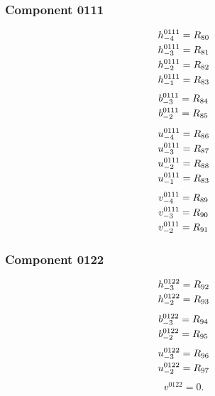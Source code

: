 \documentclass[11pt,a4paper]{article}
\begin{document}
\subsubsection{Component 0111}
\begin{equation}
\shortstack[l]{$\displaystyle h^{0111}_{-4}=R_{80}$\\
$\displaystyle h^{0111}_{-3}=R_{81}$\\
$\displaystyle h^{0111}_{-2}=R_{82}$\\
$\displaystyle h^{0111}_{-1}=R_{83}$}
\label{eq:cat-map-22}
\end{equation}
\begin{equation}
\shortstack[l]{$\displaystyle b^{0111}_{-3}=R_{84}$\\
$\displaystyle b^{0111}_{-2}=R_{85}$}
\label{eq:cat-map-23}
\end{equation}
\begin{equation}
\shortstack[l]{$\displaystyle u^{0111}_{-4}=R_{86}$\\
$\displaystyle u^{0111}_{-3}=R_{87}$\\
$\displaystyle u^{0111}_{-2}=R_{88}$\\
$\displaystyle u^{0111}_{-1}=R_{83}$}
\label{eq:cat-map-24}
\end{equation}
\begin{equation}
\shortstack[l]{$\displaystyle v^{0111}_{-4}=R_{89}$\\
$\displaystyle v^{0111}_{-3}=R_{90}$\\
$\displaystyle v^{0111}_{-2}=R_{91}$}
\label{eq:cat-map-25}
\end{equation}
\subsubsection{Component 0122}
\begin{equation}
\shortstack[l]{$\displaystyle h^{0122}_{-3}=R_{92}$\\
$\displaystyle h^{0122}_{-2}=R_{93}$}
\label{eq:cat-map-26}
\end{equation}
\begin{equation}
\shortstack[l]{$\displaystyle b^{0122}_{-3}=R_{94}$\\
$\displaystyle b^{0122}_{-2}=R_{95}$}
\label{eq:cat-map-27}
\end{equation}
\begin{equation}
\shortstack[l]{$\displaystyle u^{0122}_{-3}=R_{96}$\\
$\displaystyle u^{0122}_{-2}=R_{97}$}
\label{eq:cat-map-28}
\end{equation}
\begin{equation}
v^{0122}=0.
\label{eq:cat-map-29}
\end{equation}
\end{document}
